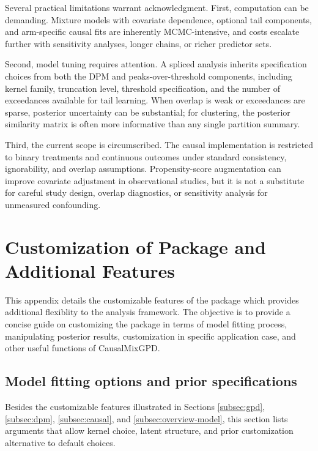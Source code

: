 \documentclass[article]{jss}\usepackage[]{graphicx}\usepackage[]{xcolor}
\DeclareRobustCommand{\pkg}[1]{\textsf{#1}}
\begin{document}
Several practical limitations warrant acknowledgment.  First,
computation can be demanding.  Mixture models with covariate
dependence, optional tail components, and arm-specific causal fits are
inherently MCMC-intensive, and costs escalate further with sensitivity
analyses, longer chains, or richer predictor sets.

Second, model tuning requires attention.  A spliced analysis inherits
specification choices from both the DPM and peaks-over-threshold
components, including kernel family, truncation level, threshold
specification, and the number of exceedances available for tail
learning.  When overlap is weak or exceedances are sparse, posterior
uncertainty can be substantial; for clustering, the posterior
similarity matrix is often more informative than any single partition
summary.

Third, the current scope is circumscribed.  The causal implementation
is restricted to binary treatments and continuous outcomes under
standard consistency, ignorability, and overlap assumptions.
Propensity-score augmentation can improve covariate adjustment in
observational studies, but it is not a substitute for careful study
design, overlap diagnostics, or sensitivity analysis for unmeasured
confounding.







\clearpage
\appendix
\section{Customization of Package and Additional Features}
\label{sec:appendix-features}

This appendix details the customizable features of the package which provides additional flexiblity to the analysis framework. The objective is to provide a concise guide on customizing the package in terms of model fitting process, manipulating posterior results, customization in specific application case, and other useful functions of \pkg{CausalMixGPD}.

\subsection{Model fitting options and prior specifications}
\label{subsec:app-modeling}

Besides the customizable features illustrated in Sections \ref{subsec:gpd}, \ref{subsec:dpm}, \ref{subsec:causal}, and \ref{subsec:overview-model}, this section lists arguments that allow kernel choice, latent structure, and prior customization alternative to default choices.
\end{document}
